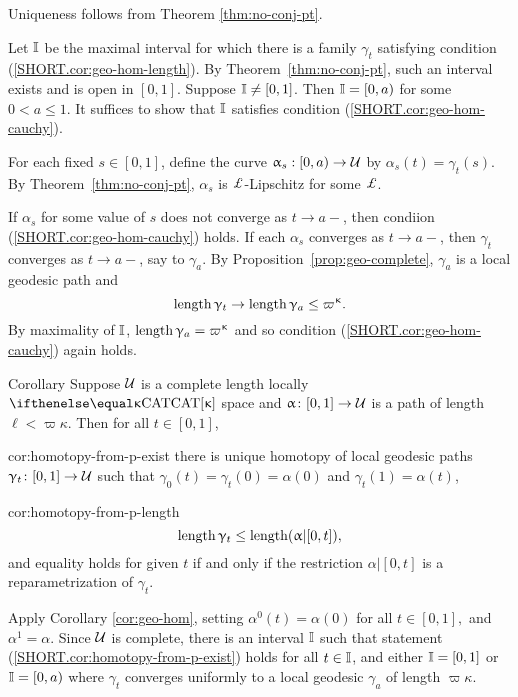  Uniqueness follows from  Theorem \ref{thm:no-conj-pt}.

Let $\mathbb{I}$ be the maximal interval for which there is a family $\gamma_t$ satisfying condition (\ref{SHORT.cor:geo-hom-length}). 
By Theorem~\ref{thm:no-conj-pt}, such an interval exists and is open in $[0,1]$.  Suppose $\mathbb{I}\ne[0,1]$. Then  $\mathbb{I}=[0,a)$ for some $0<a\le 1$.  It suffices to show that $\mathbb{I}$ satisfies condition (\ref{SHORT.cor:geo-hom-cauchy}).

For each fixed $s\in [0,1]$, define the curve $\alpha_s:[0,a)\to\spc{U}$ by $\alpha_s(t)=\gamma_t(s)$. 
By Theorem~\ref{thm:no-conj-pt}, 
$\alpha_s$ is $ \Lip$-Lipschitz for some $\Lip$.  

If $\alpha_s$  for some value of $s$ does not converge as $t\to a-$, then condiion (\ref{SHORT.cor:geo-hom-cauchy}) holds.  If each $\alpha_s$  converges as $t\to a-$,  
 then $ \gamma_t$ converges as $t\to a-$, say to $\gamma_a$.
By  Proposition~\ref{prop:geo-complete}, $\gamma_a$ is a local geodesic path and\[\length\gamma_t\to\length\gamma_a\le \varpi\kappa.\]
By maximality of $\mathbb{I}$, $\length\gamma_a=\varpi\kappa$ and so condition (\ref{SHORT.cor:geo-hom-cauchy}) again holds.
\qeds

\begin{thm}{Corollary}\label{cor:homotopy-from-p}
Suppose $\mathcal{U}$ is a complete length  locally $\CAT\kappa$ space 
and $\alpha\:[0,1]\to \spc{U}$ is a path of length $\ell<\varpi\kappa$.
Then  for all $t\in[0,1]$,

\begin{subthm}{cor:homotopy-from-p-exist}
there is unique homotopy of local geodesic paths $\gamma_t\:[0,1]\to \spc{U}$
such that $\gamma_0(t)=\gamma_t(0)=\alpha(0)$ and $\gamma_t(1)=\alpha(t)$,
\end{subthm}

\begin{subthm}{cor:homotopy-from-p-length}
\[\length\gamma_t\le\length(\alpha|[0,t]),\]
and  equality holds for given $t$ if and only if the restriction $\alpha|[0,t]$ is a reparametrization of $\gamma_t$.
\end{subthm}
\end{thm}

Apply Corollary \ref{cor:geo-hom}, setting $\alpha^0(t)=\alpha(0)$ for all $t\in [0,1],$ and $\alpha^1=\alpha$. Since $\mathcal{U}$ is complete,  there is an interval $\mathbb{I}$ such that statement (\ref{SHORT.cor:homotopy-from-p-exist}) holds for all $t\in\II$, and either $\mathbb{I}=[0,1]$ or $\mathbb{I}=[0,a)$ where $\gamma_t$ converges uniformly to a local geodesic $\gamma_a$ of length $\varpi\kappa$.

